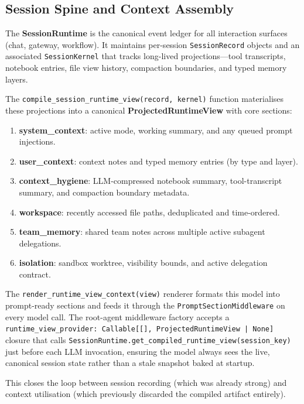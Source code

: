 \documentclass[11pt,a4paper]{article}
\begin{document}
\subsection{Session Spine and Context Assembly}
\label{sec:session-spine}

The \textbf{SessionRuntime} is the canonical event ledger for all interaction surfaces (chat, gateway, workflow).
It maintains per-session \texttt{SessionRecord} objects and an associated \texttt{SessionKernel} that tracks long-lived projections---tool transcripts, notebook entries, file view history, compaction boundaries, and typed memory layers.

The \texttt{compile\_session\_runtime\_view(record, kernel)} function materialises these projections into a canonical \textbf{ProjectedRuntimeView} with core sections:
\begin{enumerate}
  \item \textbf{system\_context}: active mode, working summary, and any queued prompt injections.
  \item \textbf{user\_context}: context notes and typed memory entries (by type and layer).
  \item \textbf{context\_hygiene}: LLM-compressed notebook summary, tool-transcript summary, and compaction boundary metadata.
  \item \textbf{workspace}: recently accessed file paths, deduplicated and time-ordered.
  \item \textbf{team\_memory}: shared team notes across multiple active subagent delegations.
  \item \textbf{isolation}: sandbox worktree, visibility bounds, and active delegation contract.
\end{enumerate}

The \texttt{render\_runtime\_view\_context(view)} renderer formats this model into prompt-ready sections and feeds it through the \texttt{PromptSectionMiddleware} on every model call.
The root-agent middleware factory accepts a \texttt{runtime\_view\_provider: Callable[[], ProjectedRuntimeView | None]} closure that calls \texttt{SessionRuntime.get\_compiled\_runtime\_view(session\_key)} just before each LLM invocation, ensuring the model always sees the live, canonical session state rather than a stale snapshot baked at startup.

This closes the loop between session recording (which was already strong) and context utilisation (which previously discarded the compiled artifact entirely).
\end{document}
